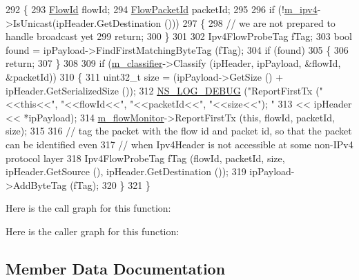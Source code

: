 \begin{DoxyCode}
292 \{
293   \hyperlink{group__flow-monitor_ga39a766c4a370cdb9ab8ac85da4b288e9}{FlowId} flowId;
294   \hyperlink{group__flow-monitor_gaa1cb18250e1672975204f1254b8aa2ae}{FlowPacketId} packetId;
295 
296   \textcolor{keywordflow}{if} (!\hyperlink{classns3_1_1Ipv4FlowProbe_a8902eb4356b3e4a0f91b9031f80c8802}{m\_ipv4}->IsUnicast(ipHeader.GetDestination ()))
297     \{
298       \textcolor{comment}{// we are not prepared to handle broadcast yet}
299       \textcolor{keywordflow}{return};
300     \}
301 
302   Ipv4FlowProbeTag fTag;
303   \textcolor{keywordtype}{bool} found = ipPayload->FindFirstMatchingByteTag (fTag);
304   \textcolor{keywordflow}{if} (found)
305     \{
306       \textcolor{keywordflow}{return};
307     \}
308 
309   \textcolor{keywordflow}{if} (\hyperlink{classns3_1_1Ipv4FlowProbe_ae4e260f1b2fa6cacbab3f6fec914172e}{m\_classifier}->Classify (ipHeader, ipPayload, &flowId, &packetId))
310     \{
311       uint32\_t size = (ipPayload->GetSize () + ipHeader.GetSerializedSize ());
312       \hyperlink{group__logging_ga413f1886406d49f59a6a0a89b77b4d0a}{NS\_LOG\_DEBUG} (\textcolor{stringliteral}{"ReportFirstTx ("}<<\textcolor{keyword}{this}<<\textcolor{stringliteral}{", "}<<flowId<<\textcolor{stringliteral}{", "}<<packetId<<\textcolor{stringliteral}{", "}<<size<<\textcolor{stringliteral}{"); "}
313                                      << ipHeader << *ipPayload);
314       \hyperlink{classns3_1_1FlowProbe_adab205c7ab7cf4c65d72d030d8aaa82a}{m\_flowMonitor}->ReportFirstTx (\textcolor{keyword}{this}, flowId, packetId, size);
315 
316       \textcolor{comment}{// tag the packet with the flow id and packet id, so that the packet can be identified even}
317       \textcolor{comment}{// when Ipv4Header is not accessible at some non-IPv4 protocol layer}
318       Ipv4FlowProbeTag fTag (flowId, packetId, size, ipHeader.GetSource (), ipHeader.GetDestination ());
319       ipPayload->AddByteTag (fTag);
320     \}
321 \}
\end{DoxyCode}


Here is the call graph for this function\+:




Here is the caller graph for this function\+:




\subsection{Member Data Documentation}
